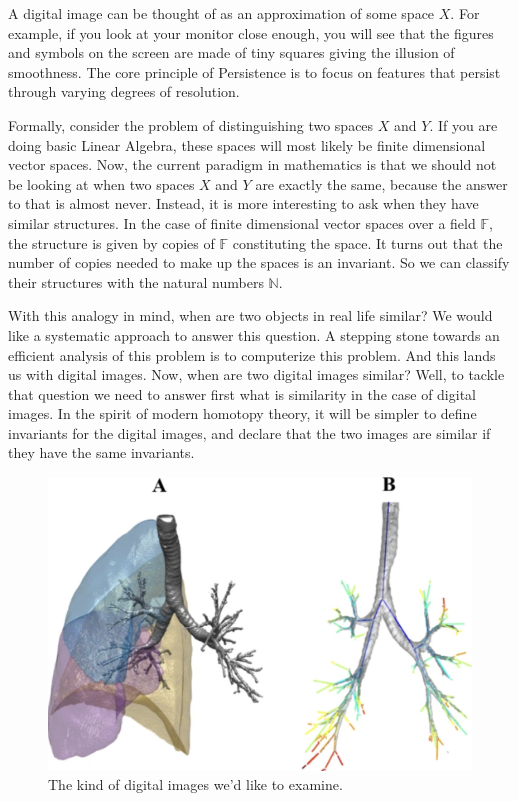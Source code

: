 \documentclass[12pt]{article}
\theoremstyle{theorem}
\theoremstyle{definition}
\theoremstyle{remark}
\theoremstyle{gremark}
\theoremstyle{discussion}
\theoremstyle{notation}
\begin{document}
		
		A digital image can be thought of as an approximation of some space $X$. 
		For example, if you look at your monitor close enough, you will see that the figures and symbols on the screen are made of tiny squares giving the illusion of smoothness. The core principle of Persistence is to focus on features that persist through varying degrees of resolution. 
		
		Formally, consider the problem of distinguishing two spaces $X$ and $Y$. If you are doing basic Linear Algebra, these spaces will most likely be finite dimensional vector spaces. Now, the current paradigm in mathematics is that we should not be looking at when two spaces $X$ and $Y$ are exactly the same, because the answer to that is almost never. Instead, it is more interesting to ask when they have similar structures. In the case of finite dimensional vector spaces over a field $\mathbb{F}$, the structure is given by copies of $\mathbb{F}$ constituting the space. It turns out that the number of copies needed to make up the spaces is an invariant. So we can classify their structures with the natural numbers $\mathbb{N}$.
		
		With this analogy in mind, when are two objects in real life similar? We would like a systematic approach to answer this question. A stepping stone towards an efficient analysis of this problem is to computerize this problem. And this lands us with digital images. Now, when are two digital images similar? Well, to tackle that question we need to answer first what is similarity in the case of digital images. In the spirit of modern homotopy theory, it will be simpler to define invariants for the digital images, and declare that the two images are similar if they have the same invariants. 
		
		\begin{figure}
			\centering
				\includegraphics[scale=0.5]{lungs}
			 \caption{The kind of digital images we'd like to examine. \cite{belchi_lung_2018}}
		\end{figure}
		
\end{document}
